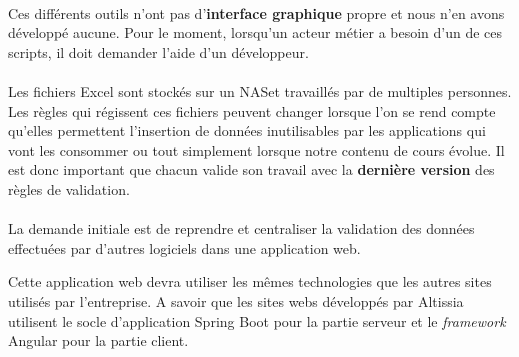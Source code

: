 
\paragraph{}
Ces différents outils n'ont pas d'\textbf{interface graphique} propre et nous n'en avons développé aucune.
Pour le moment, lorsqu'un acteur métier a besoin d'un de ces scripts, il doit demander l'aide d'un développeur.

\paragraph{}
Les fichiers Excel sont stockés sur un NAS\fnmark et travaillés par de multiples personnes.
Les règles qui régissent ces fichiers peuvent changer lorsque l'on se rend compte qu'elles permettent l'insertion de données inutilisables par les applications qui vont les consommer ou tout simplement lorsque notre contenu de cours évolue.
Il est donc important que chacun valide son travail avec la \textbf{dernière version} des règles de validation.


\paragraph{}
La demande initiale est de reprendre et centraliser la validation des données effectuées par d'autres logiciels dans une application web.

Cette application web devra utiliser les mêmes technologies que les autres sites utilisés par l'entreprise. A savoir que les sites webs développés par Altissia utilisent le socle d'application Spring Boot pour la partie serveur et le \textit{framework} Angular pour la partie client\fnmark.

